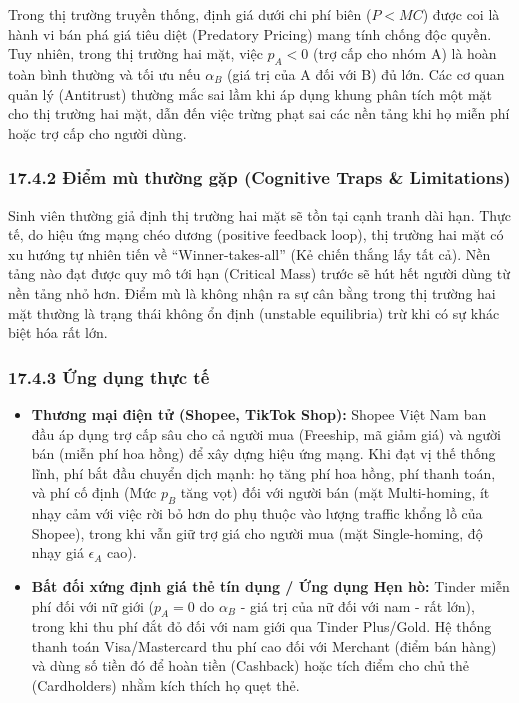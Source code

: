 \documentclass[
]{article}
\providecommand{\tightlist}{%
  \setlength{\itemsep}{0pt}\setlength{\parskip}{0pt}}
\begin{document}
Trong thị trường truyền thống, định giá dưới chi phí biên (\(P < MC\))
được coi là hành vi bán phá giá tiêu diệt (Predatory Pricing) mang tính
chống độc quyền. Tuy nhiên, trong thị trường hai mặt, việc \(p_A < 0\)
(trợ cấp cho nhóm A) là hoàn toàn bình thường và tối ưu nếu \(\alpha_B\)
(giá trị của A đối với B) đủ lớn. Các cơ quan quản lý (Antitrust) thường
mắc sai lầm khi áp dụng khung phân tích một mặt cho thị trường hai mặt,
dẫn đến việc trừng phạt sai các nền tảng khi họ miễn phí hoặc trợ cấp
cho người dùng.

\subsubsection{17.4.2 Điểm mù thường gặp (Cognitive Traps \&
Limitations)}\label{ux111iux1ec3m-muxf9-thux1b0ux1eddng-gux1eb7p-cognitive-traps-limitations-124}

Sinh viên thường giả định thị trường hai mặt sẽ tồn tại cạnh tranh dài
hạn. Thực tế, do hiệu ứng mạng chéo dương (positive feedback loop), thị
trường hai mặt có xu hướng tự nhiên tiến về ``Winner-takes-all'' (Kẻ
chiến thắng lấy tất cả). Nền tảng nào đạt được quy mô tới hạn (Critical
Mass) trước sẽ hút hết người dùng từ nền tảng nhỏ hơn. Điểm mù là không
nhận ra sự cân bằng trong thị trường hai mặt thường là trạng thái không
ổn định (unstable equilibria) trừ khi có sự khác biệt hóa rất lớn.

\subsubsection{17.4.3 Ứng dụng thực
tế}\label{ux1ee9ng-dux1ee5ng-thux1ef1c-tux1ebf-10}

\begin{itemize}
\tightlist
\item
  \textbf{Thương mại điện tử (Shopee, TikTok Shop):} Shopee Việt Nam ban
  đầu áp dụng trợ cấp sâu cho cả người mua (Freeship, mã giảm giá) và
  người bán (miễn phí hoa hồng) để xây dựng hiệu ứng mạng. Khi đạt vị
  thế thống lĩnh, phí bắt đầu chuyển dịch mạnh: họ tăng phí hoa hồng,
  phí thanh toán, và phí cố định (Mức \(p_B\) tăng vọt) đối với người
  bán (mặt Multi-homing, ít nhạy cảm với việc rời bỏ hơn do phụ thuộc
  vào lượng traffic khổng lồ của Shopee), trong khi vẫn giữ trợ giá cho
  người mua (mặt Single-homing, độ nhạy giá \(\epsilon_A\) cao).
\item
  \textbf{Bất đối xứng định giá thẻ tín dụng / Ứng dụng Hẹn hò:} Tinder
  miễn phí đối với nữ giới (\(p_A = 0\) do \(\alpha_B\) - giá trị của nữ
  đối với nam - rất lớn), trong khi thu phí đắt đỏ đối với nam giới qua
  Tinder Plus/Gold. Hệ thống thanh toán Visa/Mastercard thu phí cao đối
  với Merchant (điểm bán hàng) và dùng số tiền đó để hoàn tiền
  (Cashback) hoặc tích điểm cho chủ thẻ (Cardholders) nhằm kích thích họ
  quẹt thẻ.
\end{itemize}
\end{document}
